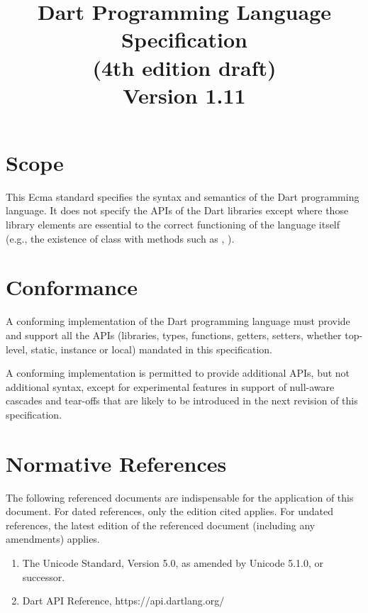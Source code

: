 \documentclass{article}
\title{Dart Programming Language  Specification  \\
(4th edition draft)\\
{\large Version 1.11}}
\begin{document}
\maketitle
\tableofcontents


\newpage

\pagestyle{myheadings}

\section{Scope}

\LMHash{}
This Ecma standard specifies the syntax and semantics of the Dart programming language.  It does not specify the APIs of the Dart libraries except where those library elements are essential to the correct functioning of the language itself (e.g., the existence of class  with methods such as , ).

\section{Conformance}

\LMHash{}
A conforming  implementation of the Dart programming language must provide and support all the  APIs (libraries, types, functions, getters, setters, whether top-level, static, instance or local) mandated in this specification. 

\LMHash{}
A conforming implementation is permitted to provide additional APIs, but not additional syntax, except for experimental features in support of null-aware cascades and tear-offs that are likely to be introduced in the next revision of this specification.

\section{Normative References}

\LMHash{}
The following referenced documents are indispensable for the application of this document. For dated references, only the edition cited applies. For undated references, the latest edition of the referenced document (including any amendments) applies.

\begin{enumerate}
\item
The Unicode Standard, Version 5.0, as amended by Unicode 5.1.0, or successor.
\item
Dart API Reference, https://api.dartlang.org/
\end{enumerate}
\end{document}
